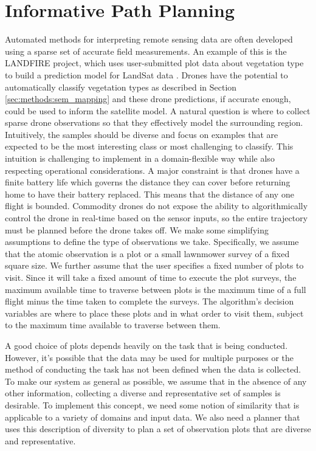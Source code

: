 \section{Informative Path Planning}
Automated methods for interpreting remote sensing data are often developed using a sparse set of accurate field measurements. An example of this is the LANDFIRE project, which uses user-submitted plot data about vegetation type to build a prediction model for LandSat data \cite{LANDFIRE2018ValueLANDFIRE}. Drones have the potential to automatically classify vegetation types as described in Section \ref{sec:methods:sem_mapping} and these drone predictions, if accurate enough, could be used to inform the satellite model. 
A natural question is where to collect sparse drone observations so that they effectively model the surrounding region. 
Intuitively, the samples should be diverse and focus on examples that are expected to be the most interesting class or most challenging to classify. This intuition is challenging to implement in a domain-flexible way while also respecting operational considerations.
A major constraint is that drones have a finite battery life which governs the distance they can cover before returning home to have their battery replaced. This means that the distance of any one flight is bounded. Commodity drones do not expose the ability to algorithmically control the drone in real-time based on the sensor inputs, so the entire trajectory must be planned before the drone takes off.
We make some simplifying assumptions to define the type of observations we take. Specifically, we assume that the atomic observation is a plot or a small lawnmower survey of a fixed square size. We further assume that the user specifies a fixed number of plots to visit. Since it will take a fixed amount of time to execute the plot surveys, the maximum available time to traverse between plots is the maximum time of a full flight minus the time taken to complete the surveys. The algorithm's decision variables are where to place these plots and in what order to visit them, subject to the maximum time available to traverse between them.


A good choice of plots depends heavily on the task that is being conducted. However, it's possible that the data may be used for multiple purposes or the method of conducting the task has not been defined when the data is collected. To make our system as general as possible, we assume that in the absence of any other information, collecting a diverse and representative set of samples is desirable. To implement this concept, we need some notion of similarity that is applicable to a variety of domains and input data. We also need a planner that uses this description of diversity to plan a set of observation plots that are diverse and representative.


